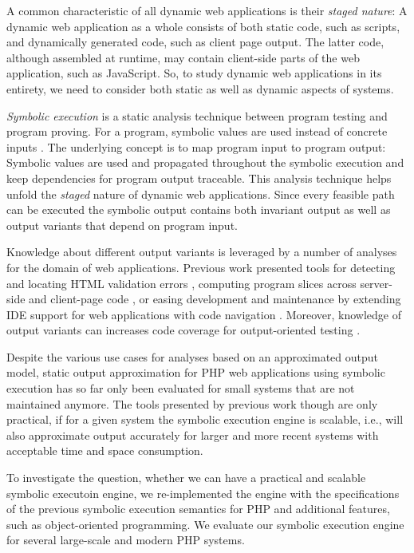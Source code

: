 \documentclass[sigconf]{acmart}
\begin{document}
A common characteristic of all dynamic web applications is their
\emph{staged nature}: A dynamic web application as a whole
consists of both static code, such as scripts, and dynamically generated code,
such as client page output. The latter code, although assembled at
runtime, may contain client-side parts of the web application, such as
JavaScript. So, to study dynamic web applications in its entirety, we need to
consider both static as well as dynamic aspects of systems.

\emph{Symbolic execution} is a static analysis technique between program testing
and program proving. For a program, symbolic values are
used instead of concrete inputs \cite{Darringer1978,King1976}. The underlying
concept is to map program input to program output: Symbolic values are used and
propagated throughout the symbolic execution and keep dependencies for program
output traceable. This analysis technique helps unfold the \emph{staged} nature
of dynamic web applications. Since every feasible path can be executed the
symbolic output contains both invariant output as well as output variants that
depend on program input.

Knowledge about different output variants is leveraged by a number of
analyses for the domain of web applications. Previous work presented tools
for detecting and locating HTML validation errors
\cite{Nguyen:2011:AFH:2190078.2190142}, computing program slices across
server-side and client-page code \cite{Nguyen:2015:CPS:2786805.2786872}, or
easing development and maintenance by extending IDE support for web applications
with code navigation \cite{Nguyen:2015:VIS:2819009.2819140,Nguyen:2014:BCG:2635868.2635928}.
Moreover, knowledge of output variants can increases code coverage for
output-oriented testing \cite{Alshahwan2011}.

Despite the various use cases for analyses based on an approximated output
model, static output approximation for PHP web applications using symbolic
execution has so far only been evaluated for small systems that are not
maintained anymore. The tools presented by previous work
\cite{Nguyen:2015:VIS:2819009.2819140,Nguyen:2014:BCG:2635868.2635928,Nguyen:2015:CPS:2786805.2786872,Nguyen:2011:AFH:2190078.2190142}
though are only practical, if for a given system the symbolic execution engine
is scalable, i.e., will also approximate output accurately for larger and more
recent systems with acceptable time and space consumption.

To investigate the question, whether we can have a practical and scalable
symbolic executoin engine, we re-implemented the engine with the specifications
of the previous symbolic execution semantics \cite{Nguyen:2014:BCG:2635868.2635928} for PHP and additional features, such
as object-oriented programming. We evaluate our
symbolic execution engine for several large-scale and modern PHP systems.
\end{document}
